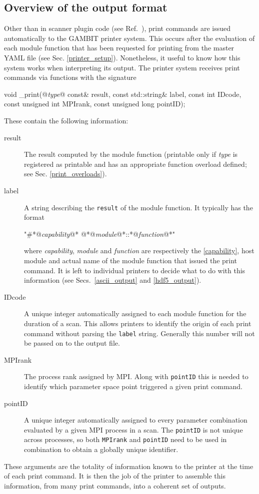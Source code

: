 \documentclass[pdftex,twocolumn,epjc3_preprint,runningheads]{svjour3}
\makeatletter
\renewcommand{\_}{\discretionary{\underscore}{}{\underscore}}
\newcommand\cpp[1]{{\lstinline!#1!}}  %
\newcommand\CPPidentifierstyle{\color{solarized@blue}\footnotesize\ttfamily}
\newcommand{\cross}[1]{\ref{#1}}
\newcommand{\metavarf}[1]{\textit{\color{darkgreen}\footnotesize\textrm{#1}}}
\newcommand{\metavar}{\metavarf}
\newcommand{\gambit}{\textsf{GAMBIT}\xspace}
\newcommand{\GB}{\gambit}
\newcommand{\mpi}{\textsf{MPI}\xspace}
\newcommand\YAML{\textsf{YAML}\xspace}
\makeatother
\begin{document}
\subsection{Overview of the output format}
\label{output_overview}
%
Other than in scanner plugin code (see Ref.\ \cite{ScannerBit}), print commands are issued automatically to the \GB printer system.  This occurs after the evaluation of each module function that has been requested for printing from the master \YAML file (see Sec. \ref{printer_setup}).  Nonetheless, it useful to know how this system works when interpreting its output.  The printer system receives print commands via functions with the signature
%
\begin{lstcpp}
void _print(@\metavar{type}@ const& result,
             const std::string& label,
             const int IDcode,
             const unsigned int MPIrank,
             const unsigned long pointID);
\end{lstcpp}
%
These contain the following information:
%
\begin{description}
\item[\CPPidentifierstyle result] The result computed by the module function (printable only if \metavar{type} is registered as printable and has an appropriate function overload defined; see Sec. \ref{print_overloads}).
\item[\CPPidentifierstyle label] A string describing the \cpp{result} of the module function. It typically has the format
 \begin{lsttermalt}
"#*@\metavar{capability}@* @*@\metavar{module}@*::*@\metavar{function}@*"
 \end{lsttermalt}
 where \metavar{capability}, \metavar{module} and \metavar{function} are respectively the \cross{capability}, host module and actual name of the module function that issued the print command. It is left to individual printers to decide what to do with this information (see Secs.\ \ref{ascii_output} and \ref{hdf5_output}).
\item[\CPPidentifierstyle IDcode] A unique integer automatically assigned to each module function for the duration of a scan. This allows printers to identify the origin of each print command without parsing the \cpp{label} string. Generally this number will not be passed on to the output file.
\item[\CPPidentifierstyle MPIrank] The process rank assigned by \mpi. Along with \cpp{pointID} this is needed to identify which parameter space point triggered a given print command.
\item[\CPPidentifierstyle pointID] A unique integer automatically assigned to every parameter combination evaluated by a given \mpi process in a scan. The \cpp{pointID} is not unique across processes, so both \cpp{MPIrank} and \cpp{pointID} need to be used in combination to obtain a globally unique identifier.
\end{description}
%
These arguments are the totality of information known to the printer at the time of each print command. It is then the job of the printer to assemble this information, from many print commands, into a coherent set of outputs.
\end{document}
